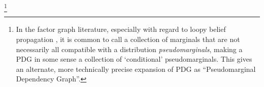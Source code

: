 \documentclass{article}
\newcommand{\vfullfootnote}[1]{}
\renewcommand{\vfullfootnote}[1]{\footnote{#1}}
\numberwithin{equation}{section}
\begin{document}
%
	\vfullfootnote{In the factor graph literature,
                  especially with regard to loopy belief propagation
                  \parencite{wainwright2007graphical}, it is common to
                  call a collection of marginals that are not
                  necessarily all compatible with a distribution
                  \emph{pseudomarginals}, making a PDG in some sense a
                  collection of `conditional' pseudomarginals. This
                  gives an alternate, more technically precise
                  expansion of PDG as ``Pseudomarginal Dependency
                  Graph''.} 
\end{document}
